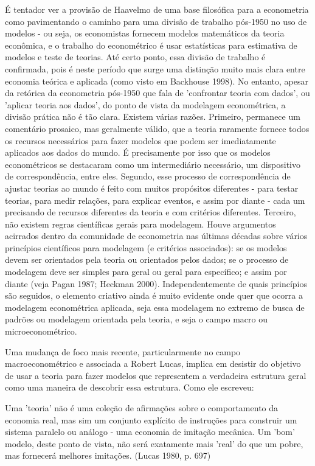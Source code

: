 \documentclass[12pt]{article}
\begin{document}
É tentador ver a provisão de Haavelmo de uma base filosófica para a econometria como pavimentando o caminho para uma divisão de trabalho pós-1950 no uso de modelos - ou seja, os economistas fornecem modelos matemáticos da teoria econômica, e o trabalho do econométrico é usar estatísticas para estimativa de modelos e teste de teorias. Até certo ponto, essa divisão de trabalho é confirmada, pois é neste período que surge uma distinção muito mais clara entre economia teórica e aplicada (como visto em Backhouse 1998). No entanto, apesar da retórica da econometria pós-1950 que fala de 'confrontar teoria com dados', ou 'aplicar teoria aos dados', do ponto de vista da modelagem econométrica, a divisão prática não é tão clara. Existem várias razões. Primeiro, permanece um comentário prosaico, mas geralmente válido, que a teoria raramente fornece todos os recursos necessários para fazer modelos que podem ser imediatamente aplicados aos dados do mundo. É precisamente por isso que os modelos econométricos se destacaram como um intermediário necessário, um dispositivo de correspondência, entre eles. Segundo, esse processo de correspondência de ajustar teorias ao mundo é feito com muitos propósitos diferentes - para testar teorias, para medir relações, para explicar eventos, e assim por diante - cada um precisando de recursos diferentes da teoria e com critérios diferentes. Terceiro, não existem regras científicas gerais para modelagem. Houve argumentos acirrados dentro da comunidade de econometria nas últimas décadas sobre vários princípios científicos para modelagem (e critérios associados): se os modelos devem ser orientados pela teoria ou orientados pelos dados; se o processo de modelagem deve ser simples para geral ou geral para específico; e assim por diante (veja Pagan 1987; Heckman 2000). Independentemente de quais princípios são seguidos, o elemento criativo ainda é muito evidente onde quer que ocorra a modelagem econométrica aplicada, seja essa modelagem no extremo de busca de padrões ou modelagem orientada pela teoria, e seja o campo macro ou microeconométrico.

Uma mudança de foco mais recente, particularmente no campo macroeconométrico e associada a Robert Lucas, implica em desistir do objetivo de usar a teoria para fazer modelos que representem a verdadeira estrutura geral como uma maneira de descobrir essa estrutura. Como ele escreveu:

Uma 'teoria' não é uma coleção de afirmações sobre o comportamento da economia real, mas sim um conjunto explícito de instruções para construir um sistema paralelo ou análogo - uma economia de imitação mecânica. Um 'bom' modelo, deste ponto de vista, não será exatamente mais 'real' do que um pobre, mas fornecerá melhores imitações. (Lucas 1980, p. 697)
\end{document}
